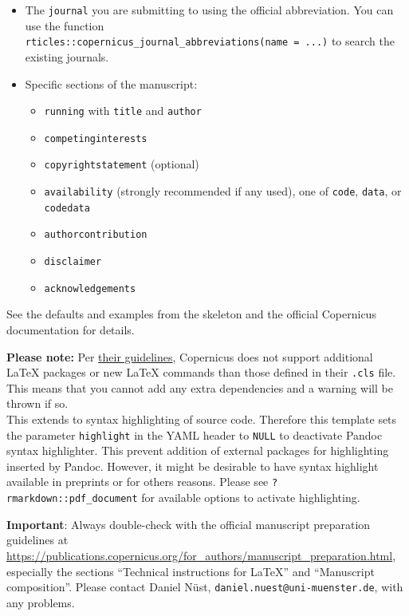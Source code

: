 \documentclass[gc, manuscript]{copernicus}
\begin{document}
\begin{itemize}
\item
  The \texttt{journal} you are submitting to using the official
  abbreviation. You can use the function
  \texttt{rticles::copernicus\_journal\_abbreviations(name\ =\ \textquotesingle{}...\textquotesingle{})}
  to search the existing journals.
\item
  Specific sections of the manuscript:

  \begin{itemize}
  \item
    \texttt{running} with \texttt{title} and \texttt{author}
  \item
    \texttt{competinginterests}
  \item
    \texttt{copyrightstatement} (optional)
  \item
    \texttt{availability} (strongly recommended if any used), one of
    \texttt{code}, \texttt{data}, or \texttt{codedata}
  \item
    \texttt{authorcontribution}
  \item
    \texttt{disclaimer}
  \item
    \texttt{acknowledgements}
  \end{itemize}
\end{itemize}

See the defaults and examples from the skeleton and the official
Copernicus documentation for details.

\textbf{Please note:} Per
\href{https://publications.copernicus.org/for_authors/manuscript_preparation.html}{their
guidelines}, Copernicus does not support additional \LaTeX{} packages or
new \LaTeX{} commands than those defined in their \texttt{.cls} file.
This means that you cannot add any extra dependencies and a warning will
be thrown if so.\\
This extends to syntax highlighting of source code. Therefore this
template sets the parameter \texttt{highlight} in the YAML header to
\texttt{NULL} to deactivate Pandoc syntax highlighter. This prevent
addition of external packages for highlighting inserted by Pandoc.
However, it might be desirable to have syntax highlight available in
preprints or for others reasons. Please see
\texttt{?rmarkdown::pdf\_document} for available options to activate
highlighting.

\textbf{Important}: Always double-check with the official manuscript
preparation guidelines at
\url{https://publications.copernicus.org/for_authors/manuscript_preparation.html},
especially the sections ``Technical instructions for LaTeX'' and
``Manuscript composition''. Please contact Daniel Nüst,
\texttt{daniel.nuest@uni-muenster.de}, with any problems.
\end{document}
